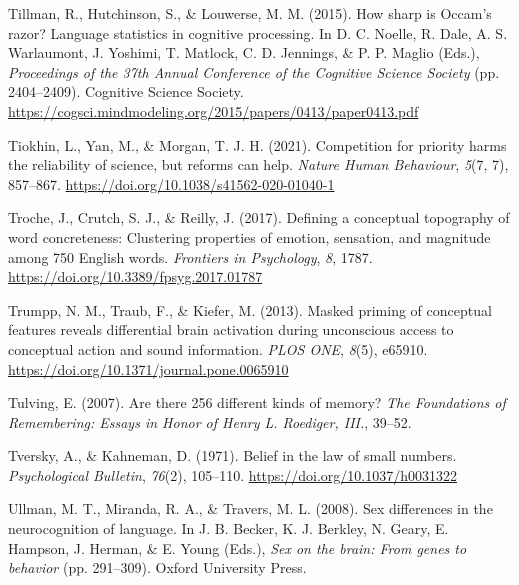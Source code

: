 \documentclass[
  12pt,
  man,floatsintext]{apa7}
\newlength{\cslhangindent}
\newlength{\cslentryspacingunit} %
\newenvironment{CSLReferences}[2] %
 {%
  \setlength{\parindent}{0pt}
  \ifodd #1
  \let\oldpar\par
  \def\par{\hangindent=\cslhangindent\oldpar}
  \fi
  \setlength{\parskip}{#2\cslentryspacingunit}
 }%
 {}
\begin{document}
\begin{CSLReferences}{1}{0}
\leavevmode{}%
Tillman, R., Hutchinson, S., \& Louwerse, M. M. (2015). How sharp is {Occam}'s razor? {Language} statistics in cognitive processing. In D. C. Noelle, R. Dale, A. S. Warlaumont, J. Yoshimi, T. Matlock, C. D. Jennings, \& P. P. Maglio (Eds.), \emph{Proceedings of the 37th {Annual Conference} of the {Cognitive Science Society}} (pp. 2404--2409). {Cognitive Science Society}. \url{https://cogsci.mindmodeling.org/2015/papers/0413/paper0413.pdf}

\leavevmode{}%
Tiokhin, L., Yan, M., \& Morgan, T. J. H. (2021). Competition for priority harms the reliability of science, but reforms can help. \emph{Nature Human Behaviour}, \emph{5}(7, 7), 857--867. \url{https://doi.org/10.1038/s41562-020-01040-1}

\leavevmode{}%
Troche, J., Crutch, S. J., \& Reilly, J. (2017). Defining a conceptual topography of word concreteness: {Clustering} properties of emotion, sensation, and magnitude among 750 {English} words. \emph{Frontiers in Psychology}, \emph{8}, 1787. \url{https://doi.org/10.3389/fpsyg.2017.01787}

\leavevmode{}%
Trumpp, N. M., Traub, F., \& Kiefer, M. (2013). Masked priming of conceptual features reveals differential brain activation during unconscious access to conceptual action and sound information. \emph{PLOS ONE}, \emph{8}(5), e65910. \url{https://doi.org/10.1371/journal.pone.0065910}

\leavevmode{}%
Tulving, E. (2007). Are there 256 different kinds of memory? \emph{The Foundations of Remembering: Essays in Honor of Henry L. Roediger, III.}, 39--52.

\leavevmode{}%
Tversky, A., \& Kahneman, D. (1971). Belief in the law of small numbers. \emph{Psychological Bulletin}, \emph{76}(2), 105--110. \url{https://doi.org/10.1037/h0031322}

\leavevmode{}%
Ullman, M. T., Miranda, R. A., \& Travers, M. L. (2008). Sex differences in the neurocognition of language. In J. B. Becker, K. J. Berkley, N. Geary, E. Hampson, J. Herman, \& E. Young (Eds.), \emph{Sex on the brain: {From} genes to behavior} (pp. 291--309). {Oxford University Press}.


\end{CSLReferences}
\end{document}
